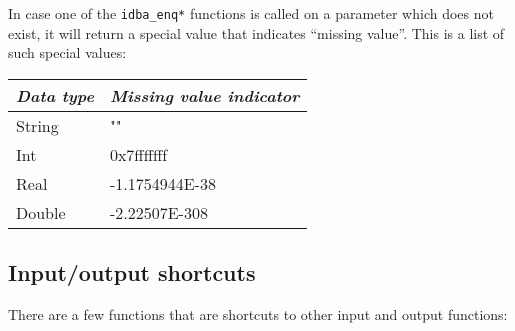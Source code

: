 \documentclass[final,12pt,a4paper,twoside]{book}
\begin{document}
In case one of the {\tt idba\_enq*} functions is called on a parameter which
does not exist, it will return a special value that indicates ``missing
value''.  This is a list of such special values:

\begin{tabular}{|l|l|}
\hline
{\em Data type} & {\em Missing value indicator}               \\
\hline
String  &  ""			\\
Int     & 0x7fffffff		\\
Real    & -1.1754944E-38	\\
Double  & -2.22507E-308		\\
\hline
\end{tabular}

\subsection {Input/output shortcuts}

\label{fun-shortcuts}

There are a few functions that are shortcuts to other input and output
functions:
\end{document}
